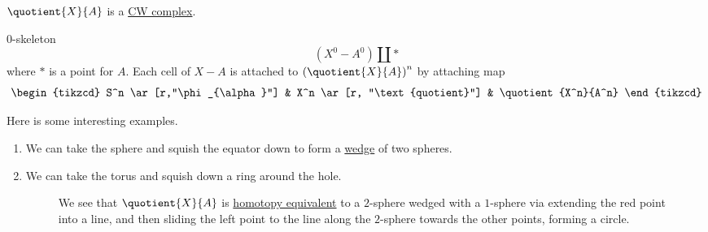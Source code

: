 \begin{remark}
	\(\quotient{X}{A} \) is a \hyperref[def:CW-Complex]{CW complex}.
\end{remark}
\(0\)-skeleton
\[
	(X^0 - A^0)\coprod *
\]
where \(*\) is a point for \(A\). Each cell of \(X-A\) is attached to \(\left(\quotient{X}{A} \right)^n\)
by attaching map
\[
	\begin{tikzcd}
		S^n \ar[r,"\phi_{\alpha}"] & X^n \ar[r, "\text{quotient}"] & \quotient{X^n}{A^n}
	\end{tikzcd}
\]

\begin{eg}
	Here is some interesting examples.
	\begin{enumerate}
		\item We can take the sphere and squish the equator down to form a \hyperref[sssec:Wedge-sum]{wedge} of two spheres.
		      \begin{figure}[H]
			      \centering
			      \label{fig:eg:quotient-cw-complex-sphere}
		      \end{figure}
		\item We can take the torus and squish down a ring around the hole.
		      \begin{figure}[H]
			      \centering
			      \caption{We see that \(\quotient{X}{A}\) is \hyperref[def:homotopy-equivalence]{homotopy equivalent}
				      to a \(2\)-sphere wedged with a \(1\)-sphere via extending the red point into a line, and then
				      sliding the left point to the line along the \(2\)-sphere towards the other points, forming a circle.}
			      \label{fig:eg:quotient-cw-complex-torus}
		      \end{figure}
	\end{enumerate}
\end{eg}
